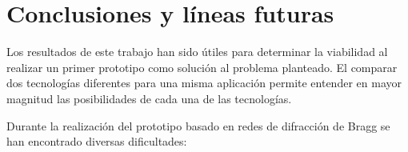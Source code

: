 \chapter{Conclusiones y líneas futuras\label{sec:conclusiones}}




Los resultados de este trabajo han sido útiles para determinar la viabilidad al realizar un primer prototipo como solución al problema planteado. El comparar dos tecnologías diferentes para una misma aplicación permite entender en mayor magnitud las posibilidades de cada una de las tecnologías. 



Durante la realización del prototipo basado en redes de difracción de Bragg se han encontrado diversas dificultades:

